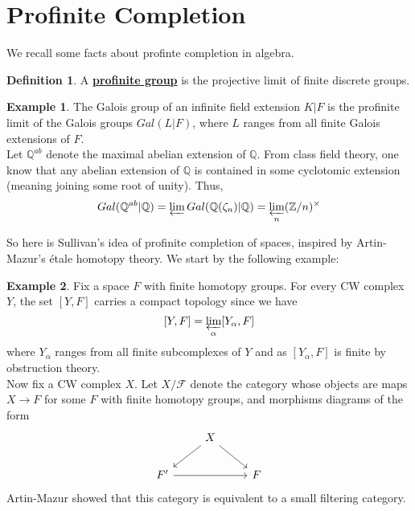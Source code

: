 \documentclass{article}
\theoremstyle{definition}
\theoremstyle{definition}
\newtheorem{definition}{Definition}[theorem]
\theoremstyle{definition}
\theoremstyle{definition}
\theoremstyle{definition}
\theoremstyle{definition}
\theoremstyle{definition}
\newtheorem{example}{Example}[theorem]
\begin{document}
\section{Profinite Completion}
We recall some facts about profinte completion in algebra.


\begin{tcolorbox}[colback=purple!5!white,colframe=purple!75!black]
\begin{definition}
A \underline{\textbf{profinite group}} is the projective limit of finite discrete groups.
\end{definition}
\end{tcolorbox}


\begin{tcolorbox}[colback=yellow!5!white,colframe=yellow!30!white]
\begin{example}
The Galois group of an infinite field extension $K|F$ is the profinite limit of the Galois groups $Gal(L|F)$, where $L$ ranges from all finite Galois extensions of $F$. \\

Let $\mathbb{Q}^{ab}$ denote the maximal abelian extension of $\mathbb{Q}$. From class field theory, one know that any abelian extension of $\mathbb{Q}$ is contained in some cyclotomic extension (meaning joining some root of unity). Thus, 
\[Gal(\mathbb{Q}^{ab}|\mathbb{Q})=\varprojlim Gal(\mathbb{Q}(\zeta_{n})|\mathbb{Q})=\varprojlim_n (\mathbb{Z}/n)^{\times}\]
\end{example}
\end{tcolorbox}
So here is Sullivan's idea of profinite completion of spaces, inspired by Artin-Mazur's 
\'etale homotopy theory. We start by the following example:


\begin{tcolorbox}[colback=yellow!5!white,colframe=yellow!30!white]
\begin{example}
Fix a space $F$ with finite homotopy groups. For every CW complex $Y$, the set $[Y,F]$ carries a compact topology since we have 
\[[Y,F]=\varprojlim_{\alpha}[Y_{\alpha}, F]\]
where $Y_{\alpha}$ ranges from all finite subcomplexes of $Y$ and as $[Y_{\alpha}, F]$ is finite by obstruction theory. \\


Now fix a CW complex $X$. Let $X/\mathcal{F}$ denote the category whose objects are maps $X\to F$ for some $F$ with finite homotopy groups, and morphisms diagrams of the form 
\[\begin{tikzcd}
	& X \\
	{F'} && F
	\arrow[from=1-2, to=2-1]
	\arrow[from=1-2, to=2-3]
	\arrow[from=2-1, to=2-3]
\end{tikzcd}\]
Artin-Mazur showed that this category is equivalent to a small filtering category. 
\end{example}
\end{tcolorbox}
\end{document}
